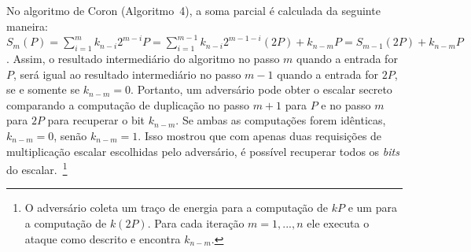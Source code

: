 \documentclass{SBCbookchapter}
\begin{document}
No algoritmo de Coron (Algoritmo~4), a soma parcial é calculada da seguinte maneira: $S_m(P) = \sum_{i=1}^{m}k_{n-i}2^{m-i} P=\sum_{i=1}^{m-1}k_{n-i}2^{m-1-i}(2P)+k_{n-m}P= S_{m-1}(2P)+k_{n-m}P$. Assim, o resultado intermediário do algoritmo no passo $m$ quando a entrada for $P$, será igual ao resultado intermediário no passo $m-1$ quando a entrada for $2P$, se e somente se $k_{n-m} = 0$. Portanto, um adversário pode obter o escalar secreto comparando a computação de duplicação no passo $m+1$ para $P$ e no passo $m$ para $2P$ para recuperar o bit $k_{n-m}$. Se ambas as computações forem idênticas, $k_{n-m} = 0$, senão $k_{n-m} = 1$. Isso mostrou que com apenas duas requisições de multiplicação escalar escolhidas pelo adversário, é possível recuperar todos os \textit{bits} do escalar.~\footnote{O adversário coleta um traço de energia para a computação de $kP$ e um para a computação de $k(2P)$. Para cada iteração $m=1,...,n$ ele executa o ataque como descrito e encontra $k_{n-m}$.}
\end{document}
